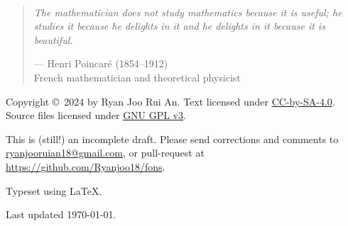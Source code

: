 \

\vfill

\begin{quote}
\textit{The mathematician does not study mathematics because it is useful; he studies it because he delights in it and he delights in it because it is beautiful.}

\begin{flushright}--- Henri Poincar\'{e} (1854--1912)\\
French mathematician and theoretical physicist\end{flushright}
\end{quote}

\vfill

Copyright \copyright \ 2024 by Ryan Joo Rui An. 
Text licensed under \href{https://creativecommons.org/licenses/by-sa/4.0/}{CC-by-SA-4.0}. Source files licensed under \href{https://choosealicense.com/licenses/gpl-3.0/}{GNU GPL v3}.

This is (still!) an incomplete draft. Please send corrections and comments to \url{ryanjooruian18@gmail.com}, or pull-request at \url{https://github.com/Ryanjoo18/fons}.

Typeset using \LaTeX.

Last updated \today.
\thispagestyle{empty}